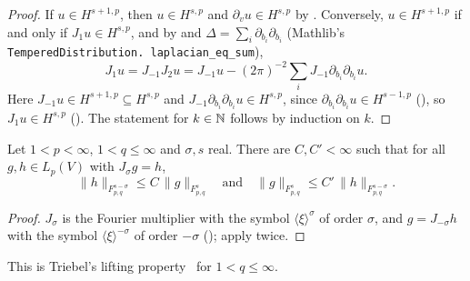 \begin{proof}
\leanok
If $u \in H^{s+1,p}$, then $u \in H^{s,p}$ and $\partial_v u \in H^{s,p}$ by
. Conversely, $u \in H^{s+1,p}$ if and only if
$J_1 u \in H^{s,p}$, and by  and
$\Delta = \sum_i \partial_{b_i} \partial_{b_i}$ (Mathlib's \texttt{TemperedDistribution.\allowbreak
laplacian\_\allowbreak eq\_\allowbreak sum}),
\[
  J_1 u = J_{-1} J_2 u = J_{-1} u - (2\pi)^{-2} \sum_i J_{-1} \partial_{b_i} \partial_{b_i} u .
\]
Here $J_{-1} u \in H^{s+1,p} \subseteq H^{s,p}$ and
$J_{-1} \partial_{b_i} \partial_{b_i} u \in H^{s,p}$, since $\partial_{b_i} \partial_{b_i} u \in
H^{s-1,p}$ (), so $J_1 u \in H^{s,p}$
(). The statement for $k \in \mathbb{N}$ follows by induction on $k$.
\end{proof}

\begin{corollary}
\label{cor:tl-lifting}
\leanok
{}
Let $1 < p < \infty$, $1 < q \leq \infty$ and $\sigma, s$ real. There are $C, C' < \infty$ such that
for all $g, h \in L_p(V)$ with $J_\sigma g = h$,
\[
  \|h\|_{F^{s-\sigma}_{p,q}} \leq C \, \|g\|_{F^s_{p,q}}
  \quad \text{and} \quad
  \|g\|_{F^s_{p,q}} \leq C' \, \|h\|_{F^{s-\sigma}_{p,q}} .
\]
\end{corollary}

\begin{proof}
\leanok
$J_\sigma$ is the Fourier multiplier with the symbol $\langle \xi \rangle^\sigma$ of order
$\sigma$, and $g = J_{-\sigma} h$ with the symbol $\langle \xi \rangle^{-\sigma}$ of order
$-\sigma$ (); apply  twice.
\end{proof}

This is Triebel's lifting property~\cite[Theorem~2.3.8]{Triebel} for $1 < q \leq \infty$.
